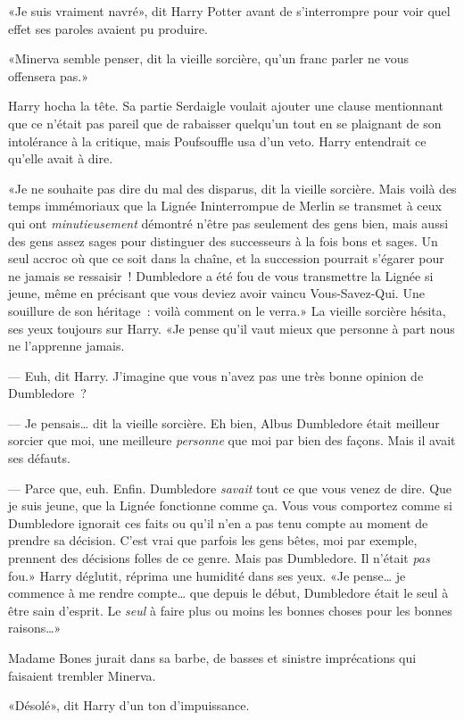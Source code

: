 «Je suis vraiment navré», dit Harry Potter avant de s'interrompre pour voir quel effet ses paroles avaient pu produire.

«Minerva semble penser, dit la vieille sorcière, qu'un franc parler ne vous offensera pas.»

Harry hocha la tête. Sa partie Serdaigle voulait ajouter une clause mentionnant que ce n'était pas pareil que de rabaisser quelqu'un tout en se plaignant de son intolérance à la critique, mais Poufsouffle usa d'un veto. Harry entendrait ce qu'elle avait à dire.

«Je ne souhaite pas dire du mal des disparus, dit la vieille sorcière. Mais voilà des temps immémoriaux que la Lignée Ininterrompue de Merlin se transmet à ceux qui ont \emph{minutieusement} démontré n'être pas seulement des gens bien, mais aussi des gens assez sages pour distinguer des successeurs à la fois bons et sages. Un seul accroc où que ce soit dans la chaîne, et la succession pourrait s'égarer pour ne jamais se ressaisir~! Dumbledore a été fou de vous transmettre la Lignée si jeune, même en précisant que vous deviez avoir vaincu Vous-Savez-Qui. Une souillure de son héritage~: voilà comment on le verra.» La vieille sorcière hésita, ses yeux toujours sur Harry. «Je pense qu'il vaut mieux que personne à part nous ne l'apprenne jamais.

--- Euh, dit Harry. J'imagine que vous n'avez pas une très bonne opinion de Dumbledore~?

--- Je pensais… dit la vieille sorcière. Eh bien, Albus Dumbledore était meilleur sorcier que moi, une meilleure \emph{personne} que moi par bien des façons. Mais il avait ses défauts.

--- Parce que, euh. Enfin. Dumbledore \emph{savait} tout ce que vous venez de dire. Que je suis jeune, que la Lignée fonctionne comme ça. Vous vous comportez comme si Dumbledore ignorait ces faits ou qu'il n'en a pas tenu compte au moment de prendre sa décision. C'est vrai que parfois les gens bêtes, moi par exemple, prennent des décisions folles de ce genre. Mais pas Dumbledore. Il n'était \emph{pas} fou.» Harry déglutit, réprima une humidité dans ses yeux. «Je pense… je commence à me rendre compte… que depuis le début, Dumbledore était le seul à être sain d'esprit. Le \emph{seul} à faire plus ou moins les bonnes choses pour les bonnes raisons…»

Madame Bones jurait dans sa barbe, de basses et sinistre imprécations qui faisaient trembler Minerva.

«Désolé», dit Harry d'un ton d'impuissance.


